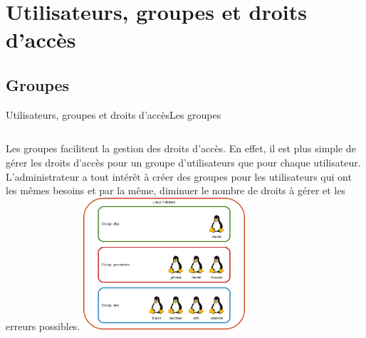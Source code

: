 \documentclass{beamer}
\begin{document}
    \section{Utilisateurs, groupes et droits d'accès}\label{sec:utilisateurs-groupes-droits}

    \subsection{Groupes}\label{subsec:groupes}

    \begin{frame}{Utilisateurs, groupes et droits d'accès}{Les groupes}
        \begin{columns}
            Les groupes facilitent la gestion des droits d'accès.
            En effet, il est plus simple de gérer les droits d'accès pour un groupe d'utilisateurs que pour chaque utilisateur.
            \bigbreak
            L'administrateur a tout intérêt à créer des groupes pour les utilisateurs qui ont les mêmes besoins et par la même, diminuer le nombre de droits à gérer et les erreurs possibles.
            \centering
            \includegraphics[width=6cm]{image/groups-and-users.drawio}
        \end{columns}
    \end{frame}
\end{document}
